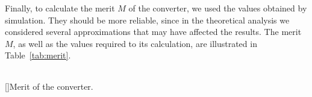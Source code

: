 Finally, to calculate the merit $M$ of the converter, we used the values obtained by simulation. They should be more reliable, since in the theoretical analysis we considered several approximations that may have affected the results. The merit $M$, as well as the values required to its calculation, are illustrated in Table~\ref{tab:merit}.

\vspace{2mm}

\begin{center}
\begin{tabular}{ | c | c | }\hline
 
\end{tabular}
[]{Merit of the converter.}
\label{tab:merit}
\end{center}

